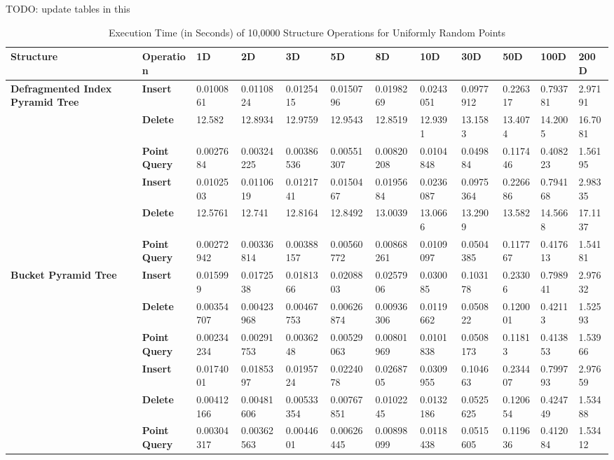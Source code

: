 \begin{landscape}

	TODO: update tables in this

	\begin{table}
		\centering
		\begin{tabular}{|p{2cm}|l|l|l|l|l|l|l|l|l|l|l|}
			\hline
			\textbf{Structure} & \textbf{Operation} & \textbf{1D} & \textbf{2D} & \textbf{3D} & \textbf{5D} & \textbf{8D} & \textbf{10D} & \textbf{30D} & \textbf{50D} & \textbf{100D} & \textbf{200D} \\
			\hline
			\multirow{ 4}{*}{\textbf{Defragmented Index Pyramid Tree}} & \textbf{Insert} & 0.0100861 & 0.0110824 & 0.0125415 & 0.0150796 & 0.0198269 & 0.0243051 & 0.0977912 & 0.226317 & 0.793781 & 2.97191 \\
			 & \textbf{Delete} & 12.582 & 12.8934 & 12.9759 & 12.9543 & 12.8519 & 12.9391 & 13.1583 & 13.4074 & 14.2005 & 16.7081 \\
			 & \textbf{Point Query} & 0.0027684 & 0.00324225 & 0.00386536 & 0.00551307 & 0.00820208 & 0.0104848 & 0.049884 & 0.117446 & 0.408223 & 1.56195 \\
			\hline
			\multirow{ 4}{*}{\textbf{Rebuild Index Pyramid Tree}} & \textbf{Insert} & 0.0102503 & 0.0110619 & 0.0121741 & 0.0150467 & 0.0195684 & 0.0236087 & 0.0975364 & 0.226686 & 0.794168 & 2.98335 \\
			 & \textbf{Delete} & 12.5761 & 12.741 & 12.8164 & 12.8492 & 13.0039 & 13.0666 & 13.2909 & 13.582 & 14.5668 & 17.1137 \\
			 & \textbf{Point Query} & 0.00272942 & 0.00336814 & 0.00388157 & 0.00560772 & 0.00868261 & 0.0109097 & 0.0504385 & 0.117767 & 0.417613 & 1.54181 \\
			\hline
			\multirow{ 4}{*}{\textbf{Bucket Pyramid Tree}} & \textbf{Insert} & 0.015999 & 0.0172538 & 0.0181366 & 0.0208803 & 0.0257906 & 0.030085 & 0.103178 & 0.23306 & 0.798941 & 2.97632 \\
			 & \textbf{Delete} & 0.00354707 & 0.00423968 & 0.00467753 & 0.00626874 & 0.00936306 & 0.0119662 & 0.050822 & 0.120001 & 0.42113 & 1.52593 \\
			 & \textbf{Point Query} & 0.00234234 & 0.00291753 & 0.0036248 & 0.00529063 & 0.00801969 & 0.0101838 & 0.0508173 & 0.11813 & 0.413853 & 1.53966 \\
			\hline
			\multirow{ 4}{*}{\textbf{Splay Pyramid Tree}} & \textbf{Insert} & 0.0174001 & 0.0185397 & 0.0195724 & 0.0224078 & 0.0268705 & 0.0309955 & 0.104663 & 0.234407 & 0.799793 & 2.97659 \\
			 & \textbf{Delete} & 0.00412166 & 0.00481606 & 0.00533354 & 0.00767851 & 0.0102245 & 0.0132186 & 0.0525625 & 0.120654 & 0.424749 & 1.53488  \\
			 & \textbf{Point Query} & 0.00304317 & 0.00362563 & 0.0044601 & 0.00626445 & 0.00898099 & 0.0118438 & 0.0515605 & 0.119636 & 0.412084 & 1.53412 \\
			\hline
		\end{tabular}
		\caption{Execution Time (in Seconds) of 10,0000 Structure Operations for Uniformly Random Points}
		\label{tab:perf2-randuniform}
	\end{table}


\end{landscape}
